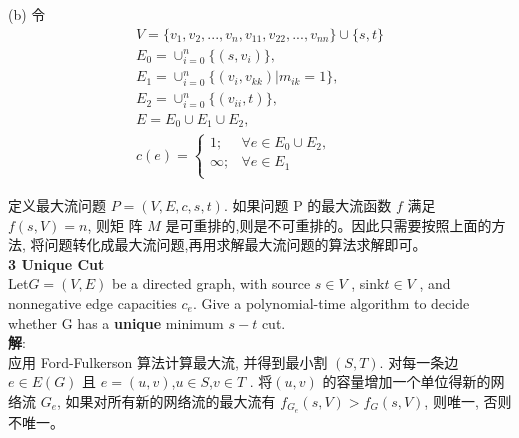 \documentclass[11pt]{article}
\begin{document}
\begin{CJK}{UTF8}{gkai}
(b) 令\\
\begin{eqnarray*}
V=\{v_1,v_2,...,v_n,v_{11},v_{22},...,v_{nn}\}\cup\{s,t\}\\
E_0=\cup_{i=0}^n\{(s,v_i)\},\\
E_1=\cup_{i=0}^n\{(v_i,v_{kk})|m_{ik}=1\},\\
E_2=\cup_{i=0}^n\{(v_{ii},t)\},\\
E=E_0\cup E_1 \cup E_2,\\
c(e)=
\begin{cases}
	1;     &\forall e\in E_0\cup E_2,\\
	\infty;&\forall e\in E_1 \\
\end{cases}
\end{eqnarray*}

定义最大流问题 $P = (V, E, c, s, t)$. 如果问题 P 的最大流函数 $f$ 满足 $f (s, V ) = n$, 则矩
阵 $M$ 是可重排的,则是不可重排的。因此只需要按照上面的方法,
将问题转化成最大流问题,再用求解最大流问题的算法求解即可。\\[2mm]

{\bf \large  3 Unique Cut}\\

Let$ G = (V, E)$ be a directed graph, with source $s\in V$ , sink$ t\in V$ , and
nonnegative edge capacities ${c_e}$. Give a polynomial-time algorithm to decide
whether G has a {\bf unique} minimum $s − t$ cut.\\
{\bf 解}:\\
应用 Ford-Fulkerson 算法计算最大流,
并得到最小割 $(S, T )$. 对每一条边 $e\in E(G)$ 且 $e = (u, v)$,$ u\in S$,$ v \in T$ . 将$ (u, v)$ 的容量增加一个单位得新的网络流 $G_e$,
如果对所有新的网络流的最大流有 $f_{G_e} (s, V ) > f_G (s, V )$, 则唯一,
否则不唯一。\\



\end{CJK}
\end{document}
